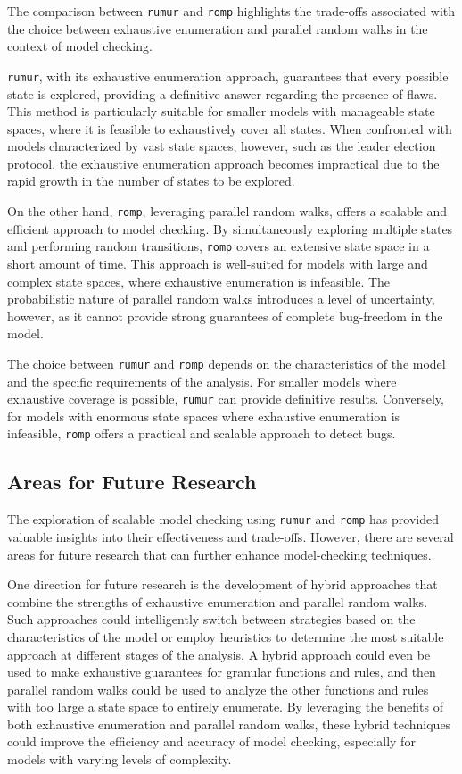 The comparison between \texttt{rumur} and \texttt{romp} highlights the
trade-offs associated with the choice between exhaustive enumeration and
parallel random walks in the context of model checking.

\texttt{rumur}, with its exhaustive enumeration approach,
guarantees that every possible state is explored, providing a definitive
answer regarding the presence of flaws.
This method is particularly suitable for smaller models with manageable state
spaces, where it is feasible to exhaustively cover all states.
When confronted with models characterized by vast state spaces, however,
such as the leader election protocol, the exhaustive enumeration approach
becomes impractical due to the rapid growth in the number of states to
be explored.

On the other hand, \texttt{romp}, leveraging parallel random walks,
offers a scalable and efficient approach to model checking.
By simultaneously exploring multiple states and performing random transitions,
\texttt{romp} covers an extensive state space in a short amount of time.
This approach is well-suited for models with large and complex state spaces,
where exhaustive enumeration is infeasible.
The probabilistic nature of parallel random walks introduces a level of
uncertainty, however, as it cannot provide strong guarantees of complete
bug-freedom in the model.

The choice between \texttt{rumur} and \texttt{romp} depends on the
characteristics of the model and the specific requirements of the analysis.
For smaller models where exhaustive coverage is possible, \texttt{rumur} can
provide definitive results.
Conversely, for models with enormous state spaces where exhaustive
enumeration is infeasible, \texttt{romp} offers a practical and scalable
approach to detect bugs.

\subsection{Areas for Future Research}\label{subsec:areas-for-future-research}

The exploration of scalable model checking using \texttt{rumur} and
\texttt{romp} has provided valuable insights into their effectiveness and
trade-offs.
However, there are several areas for future research that can further enhance
model-checking techniques.

One direction for future research is the development of hybrid approaches
that combine the strengths of exhaustive enumeration and parallel random walks.
Such approaches could intelligently switch between strategies based on the
characteristics of the model or employ heuristics to determine the most
suitable approach at different stages of the analysis.
A hybrid approach could even be used to make exhaustive guarantees for
granular functions and rules, and then parallel random walks could be used to
analyze the other functions and rules with too large a state space to entirely
enumerate.
By leveraging the benefits of both exhaustive enumeration and parallel random
walks, these hybrid techniques could improve the efficiency and accuracy of
model checking, especially for models with varying levels of complexity.

